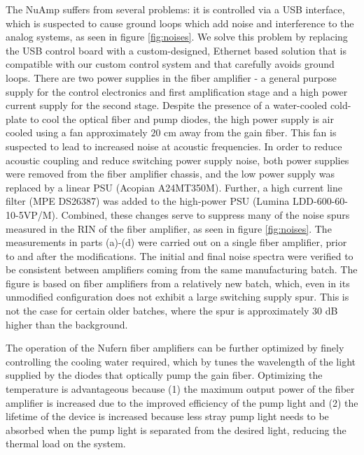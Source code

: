 \documentclass[twocolumn,aps,pra,showpacs,preprintnumbers,bibnotes]{revtex4-1}
\begin{document}
The NuAmp suffers from several problems: it is controlled via a USB interface, which is suspected to cause ground loops which add noise and interference to the analog systems, as seen in figure \ref{fig:noises}.
We solve this problem by replacing the USB control board with a custom-designed, Ethernet based solution that is compatible with our custom control system and that carefully avoids ground loops. 
There are two power supplies in the fiber amplifier - a general purpose supply for the control electronics and first amplification stage and a high power current supply for the second stage. 
Despite the presence of a water-cooled cold-plate to cool the optical fiber and pump diodes, the high power supply is air cooled using a fan approximately $20$ cm away from the gain fiber. 
This fan is suspected to lead to increased noise at acoustic frequencies.
In order to reduce acoustic coupling and reduce switching power supply noise, both power supplies were removed from the fiber amplifier chassis, and the low power supply was replaced by a linear PSU (Acopian A24MT350M). 
Further, a high current line filter (MPE DS26387) was added to the high-power PSU (Lumina LDD-600-60-10-5VP/M).
Combined, these changes serve to suppress many of the noise spurs measured in the RIN of the fiber amplifier, as seen in figure \ref{fig:noises}. 
The measurements in parts (a)-(d) were carried out on a single fiber amplifier, prior to and after the modifications. The initial and final noise spectra were verified to be consistent between amplifiers coming from the same manufacturing batch.
The figure is based on fiber amplifiers from a relatively new batch, which, even in its unmodified configuration does not exhibit a large switching supply spur. 
This is not the case for certain older batches, where the spur is approximately 30 dB higher than the background.

The operation of the Nufern fiber amplifiers can be further optimized by finely controlling the cooling water required, which by tunes the wavelength of the light supplied by the diodes that optically pump the gain fiber.
Optimizing the temperature is advantageous because (1) the maximum output power of the fiber amplifier is increased due to the improved efficiency of the pump light and (2) the lifetime of the device is increased because less stray pump light needs to be absorbed when the pump light is separated from the desired light, reducing the thermal load on the system. 
\end{document}
